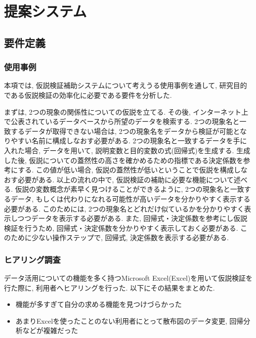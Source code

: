 \documentclass[sotsuron]{kuee}
\begin{document}
\chapter{提案システム}


\section{要件定義}
\subsection{使用事例}
本項では, 仮説検証補助システムについて考えうる使用事例を通して, 研究目的である仮説検証の効率化に必要である要件を分析した.

まずは, 2つの現象の関係性についての仮説を立てる. その後, インターネット上で公表されているデータベースから所望のデータを検索する.
2つの現象名と一致するデータが取得できない場合は, 2つの現象名をデータから検証が可能となりやすい名前に構成しなおす必要がある.
2つの現象名と一致するデータを手に入れた場合, データを用いて, 説明変数と目的変数の式(回帰式)を生成する.
生成した後, 仮説についての蓋然性の高さを確かめるための指標である決定係数を参考にする. この値が低い場合, 仮説の蓋然性が低いということで仮説を構成しなおす必要がある.
以上の流れの中で, 仮説検証の補助に必要な機能について述べる.
仮説の変数概念が素早く見つけることができるように, 2つの現象名と一致するデータ, もしくは代わりになれる可能性が高いデータを分かりやすく表示する必要がある.
このためには, 2つの現象名とどれだけ似ているかを分かりやすく表示しつつデータを表示する必要がある.
また, 回帰式・決定係数を参考にし仮説検証を行うため, 回帰式・決定係数を分かりやすく表示しておく必要がある.
このために少ない操作ステップで, 回帰式, 決定係数を表示する必要がある.

\subsection{ヒアリング調査}
データ活用についての機能を多く持つMicrosoft Excel(Excel)を用いて仮説検証を行た際に, 利用者へヒアリングを行った. 以下にその結果をまとめた.

\begin{itemize}
 \item 機能が多すぎて自分の求める機能を見つけづらかった
 \item あまりExcelを使ったことのない利用者にとって散布図のデータ変更, 回帰分析などが複雑だった
\end{itemize}
\end{document}
